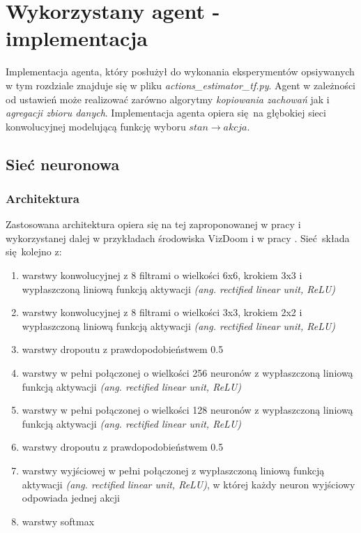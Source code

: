 \section{Wykorzystany agent - implementacja}

Implementacja agenta, który posłużył do wykonania eksperymentów opsiywanych w tym rozdziale znajduje się w pliku \textit{actions\_estimator\_tf.py}. Agent w zależności od ustawień może realizować zarówno algorytmy \textit{kopiowania zachowań} jak i \textit{agregacji zbioru danych}. Implementacja agenta opiera się na głębokiej sieci konwolucyjnej modelującą funkcję wyboru $stan \rightarrow akcja$.


\subsection{Sieć neuronowa}

\subsubsection{Architektura}\label{agent_net}
Zastosowana architektura opiera się na tej zaproponowanej w pracy \cite{mnih2015human} i wykorzystanej dalej w przykładach środowiska VizDoom i w pracy \cite{DBLP:journals/corr/KempkaWRTJ16}. Sieć składa się kolejno z:

\begin{enumerate}
\item{warstwy konwolucyjnej z 8 filtrami o wielkości 6x6, krokiem 3x3 i wypłaszczoną liniową funkcją aktywacji \textit{(ang. rectified linear unit, ReLU)}}
\item{warstwy konwolucyjnej z 8 filtrami o wielkości 3x3, krokiem 2x2 i wypłaszczoną liniową funkcją aktywacji \textit{(ang. rectified linear unit, ReLU)}}
\item{warstwy dropoutu z prawdopodobieństwem 0.5}
\item{warstwy w pełni połączonej o wielkości 256 neuronów z wypłaszczoną liniową funkcją aktywacji \textit{(ang. rectified linear unit, ReLU)}}
\item{warstwy w pełni połączonej o wielkości 128 neuronów z wypłaszczoną liniową funkcją aktywacji \textit{(ang. rectified linear unit, ReLU)}}
\item{warstwy dropoutu z prawdopodobieństwem 0.5}
\item{warstwy wyjściowej w pełni połączonej z wypłaszczoną liniową funkcją aktywacji \textit{(ang. rectified linear unit, ReLU)}, w której każdy neuron wyjściowy odpowiada jednej akcji}
\item{warstwy softmax}
\end{enumerate}

